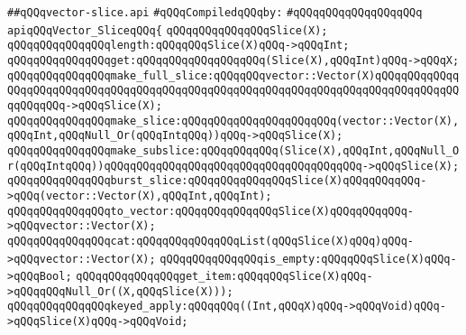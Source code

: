 \label{src/lib/std/src/vector-slice.api}
\verb|##qQQqvector-slice.api|\newline
\newline
\verb|#qQQqCompiledqQQqby:|\newline
\verb|#qQQqqQQqqQQqqQQqqQQq|\newline
\newline
\newline
\newline
\verb|apiqQQqVector_SliceqQQq{|\newline
\newline
\verb|qQQqqQQqqQQqqQQqSlice(X);|\newline
\newline
\verb|qQQqqQQqqQQqqQQqlength:qQQqqQQqSlice(X)qQQq->qQQqInt;|\newline
\verb|qQQqqQQqqQQqqQQqget:qQQqqQQqqQQqqQQqqQQq(Slice(X),qQQqInt)qQQq->qQQqX;|\newline
\newline
\verb|qQQqqQQqqQQqqQQqmake_full_slice:qQQqqQQqvector::Vector(X)qQQqqQQqqQQqqQQqqQQqqQQqqQQqqQQqqQQqqQQqqQQqqQQqqQQqqQQqqQQqqQQqqQQqqQQqqQQqqQQqqQQqqQQqqQQq->qQQqSlice(X);|\newline
\verb|qQQqqQQqqQQqqQQqmake_slice:qQQqqQQqqQQqqQQqqQQqqQQq(vector::Vector(X),qQQqInt,qQQqNull_Or(qQQqIntqQQq))qQQq->qQQqSlice(X);|\newline
\verb|qQQqqQQqqQQqqQQqmake_subslice:qQQqqQQqqQQq(Slice(X),qQQqInt,qQQqNull_Or(qQQqIntqQQq))qQQqqQQqqQQqqQQqqQQqqQQqqQQqqQQqqQQqqQQq->qQQqSlice(X);|\newline
\newline
\verb|qQQqqQQqqQQqqQQqburst_slice:qQQqqQQqqQQqqQQqSlice(X)qQQqqQQqqQQq->qQQq(vector::Vector(X),qQQqInt,qQQqInt);|\newline
\verb|qQQqqQQqqQQqqQQqto_vector:qQQqqQQqqQQqqQQqSlice(X)qQQqqQQqqQQq->qQQqvector::Vector(X);|\newline
\verb|qQQqqQQqqQQqqQQqcat:qQQqqQQqqQQqqQQqList(qQQqSlice(X)qQQq)qQQq->qQQqvector::Vector(X);|\newline
\newline
\verb|qQQqqQQqqQQqqQQqis_empty:qQQqqQQqSlice(X)qQQq->qQQqBool;|\newline
\verb|qQQqqQQqqQQqqQQqget_item:qQQqqQQqSlice(X)qQQq->qQQqqQQqNull_Or((X,qQQqSlice(X)));|\newline
\newline
\verb|qQQqqQQqqQQqqQQqkeyed_apply:qQQqqQQq((Int,qQQqX)qQQq->qQQqVoid)qQQq->qQQqSlice(X)qQQq->qQQqVoid;|\newline
